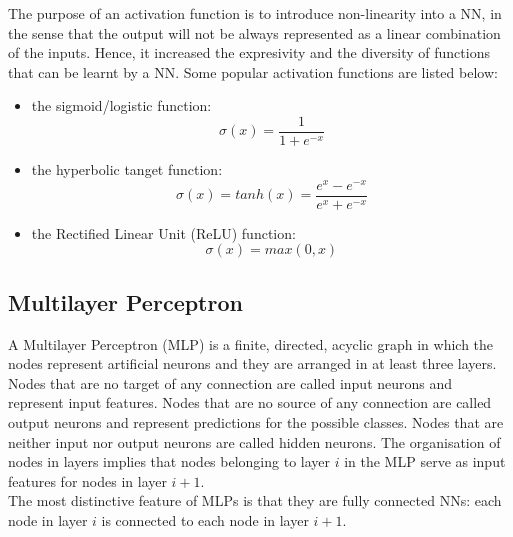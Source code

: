 The purpose of an activation function is to introduce non-linearity into a NN, in the sense that the output will not be always represented as a linear combination of the inputs. Hence, it increased the expresivity and the diversity of functions that can be learnt by a NN. Some popular activation functions are listed below:\\

\begin{itemize}
  \item the sigmoid/logistic function: \\
        \begin{equation}
          \sigma(x) = \frac{1}{1 + e^{-x}}
        \end{equation}

  \item the hyperbolic tanget function: \\
        \begin{equation}
          \sigma(x) = tanh(x) = \frac{e^{x} - e^{-x}}{e^{x} + e^{-x}}
        \end{equation}

  \item the Rectified Linear Unit (ReLU) function: \\
        \begin{equation}
          \sigma(x) = max(0,x)
        \end{equation}
\end{itemize}


\subsection{Multilayer Perceptron}

A Multilayer Perceptron (MLP) is a finite, directed, acyclic graph in which the nodes represent artificial neurons and they are arranged in at least three layers. Nodes that are no target of any connection are called input neurons and represent input features. Nodes that are no source of any connection are called output neurons and represent predictions for the possible classes. Nodes that are neither input nor output neurons are called hidden neurons. The organisation of nodes in layers implies that nodes belonging to layer $i$ in the MLP serve as input features for nodes in layer $i+1$. \\

The most distinctive feature of MLPs is that they are fully connected NNs: each node in layer $i$ is connected to each node in layer $i+1$.

